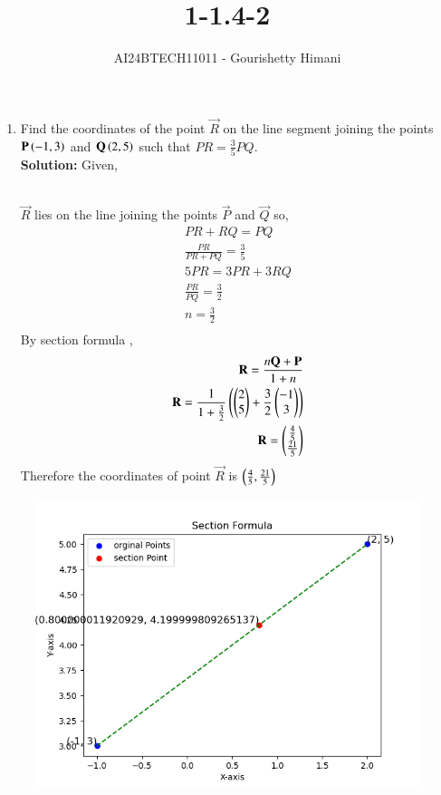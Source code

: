 \documentclass[journal,12pt,onecolumn]{IEEEtran}
\theoremstyle{remark}
\begin{document}

\vspace{3cm}

\title{1-1.4-2}
\author{AI24BTECH11011 - Gourishetty Himani}
\maketitle	
\bigskip

\renewcommand{\thefigure}{\theenumi}
\renewcommand{\thetable}{\theenumi}
\begin{enumerate}

\item Find the coordinates of the point $\vec{R}$ on the line segment joining the points $\mathbf{P}\left(-1,3\right)$ and $\mathbf{Q}\left(2,5\right)$ such that $PR=\frac{3}{5}PQ$.\\
\textbf{Solution:} Given,\\
\begin{table}[h!]    
  \centering
  
  \label{tab1-1.4-2}
\end{table}\\
 $\vec{R}$ lies on the line joining the points $\vec{P}$ and $\vec{Q}$ so,
\begin{align}
PR + RQ = PQ  \\
\frac{PR}{PR+PQ}=\frac{3}{5}\\ 
5PR=3PR+3RQ \\
\frac{PR}{PQ}=\frac{3}{2}\\
 n=\frac{3}{2}\\
\end{align}
By section formula ,\\ 
\begin{align}
\mathbf{R}=\frac{n\mathbf{Q}+\mathbf{P}}{1+n}\\
\mathbf{R}=\frac{1}{1+\frac{3}{2}}\left(\begin{pmatrix}2 \\ 5\end{pmatrix}+\frac{3}{2}\begin{pmatrix}-1 \\ 3\end{pmatrix}\right)\\
 \mathbf{R}=\begin{pmatrix}\frac{4}{5}\\\frac{21}{5}\end{pmatrix}\\
\end{align}
 Therefore the coordinates of point $\vec{R}$ is $\left(\frac{4}{5},\frac{21}{5}\right)$
\end{enumerate}
\begin{figure}[h!]
\centering
\includegraphics[width=0.7\linewidth]{figs/q1.png}
\label{fig1}
\end{figure}
\end{document}
